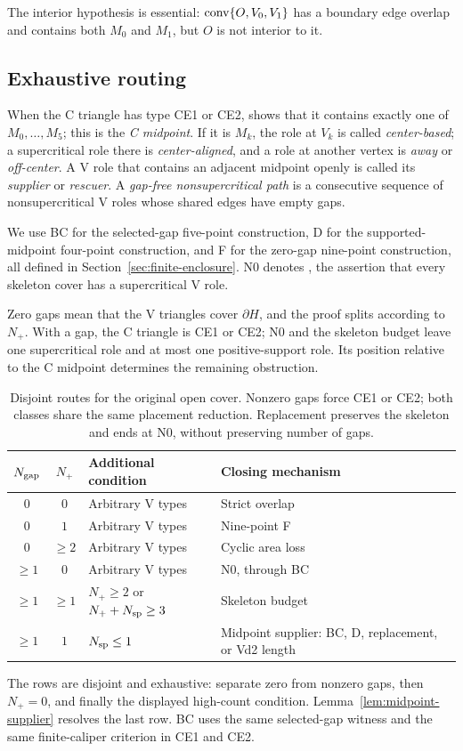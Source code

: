 The interior hypothesis is essential: $\mathrm{conv}\{O,V_0,V_1\}$ has a boundary
edge overlap and contains both $M_0$ and $M_1$, but $O$ is not interior to it.

\subsection{Exhaustive routing}

When the C triangle has type CE1 or CE2, 
shows that it contains exactly one of $M_0,\ldots,M_5$; this is the
\emph{C midpoint}. If it is $M_k$, the role at $V_k$ is called
\emph{center-based}; a supercritical role there is \emph{center-aligned},
and a role at another vertex is \emph{away} or \emph{off-center}.
A V role that contains an adjacent midpoint openly is
called its \emph{supplier} or \emph{rescuer}. A \emph{gap-free
nonsupercritical path} is a consecutive sequence of nonsupercritical V
roles whose shared edges have empty gaps.

We use BC for the selected-gap five-point construction, D for the supported-
midpoint four-point construction, and F for the zero-gap nine-point
construction, all defined in Section~\ref{sec:finite-enclosure}.
N0 denotes , the assertion that every skeleton
cover has a supercritical V role.

Zero gaps mean that the V triangles cover $\partial H$, and the proof
splits according to $N_+$. With a gap, the C triangle is CE1 or CE2;
N0 and the skeleton budget leave one supercritical role and at most one
positive-support role. Its position relative to the C midpoint determines
the remaining obstruction.

\begin{table}[H]
\centering\small
\setlength{\tabcolsep}{5pt}\renewcommand{\arraystretch}{1.15}
\begin{tabular}{@{}ccp{}p{}@{}}
\toprule
$N_{\rm gap}$&$N_+$&Additional condition&Closing mechanism\\
\midrule
$0$&$0$&Arbitrary V types&Strict overlap\\
$0$&$1$&Arbitrary V types&Nine-point F\\
$0$&$\ge2$&Arbitrary V types&Cyclic area loss\\
\midrule
$\ge1$&$0$&Arbitrary V types&N0, through BC\\
$\ge1$&$\ge1$&$N_+\ge2$ or $N_++N_{\rm sp}\ge3$&Skeleton budget\\
$\ge1$&$1$&$N_{\rm sp}\le1$&Midpoint supplier: BC, D, replacement, or Vd2 length\\
\bottomrule
\end{tabular}
\caption{Disjoint routes for the original open cover. Nonzero gaps force
CE1 or CE2; both classes share the same placement reduction. Replacement
preserves the skeleton and ends at N0, without preserving number of gaps.}
\label{tab:routing}
\end{table}

The rows are disjoint and exhaustive: separate zero from nonzero gaps,
then $N_+=0$, and finally the displayed high-count condition.
Lemma~\ref{lem:midpoint-supplier} resolves the last row. BC uses the same
selected-gap witness and the same finite-caliper criterion in CE1 and CE2.
